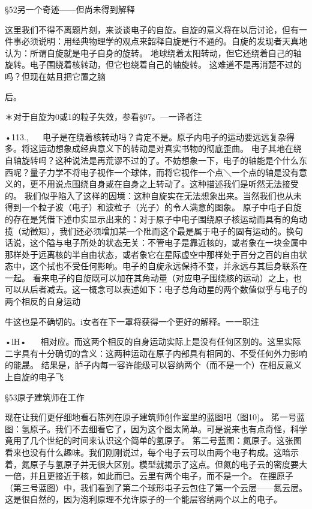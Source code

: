 §52另一个奇迹——但尚未得到解释

这里我们不得不离题片刻，来谈谈电子的自旋。自旋的意义将在以后讨论，但有一件事必须说明：用经典物理学的观点来韶释自旋是行不通的。自旋的发现者天真地认为：所谓自旋就是电子自身的旋转。
地球绕着太阳转动，但它还绕着自己的轴旋转。电子围绕着核转动，但它也绕着自己的轴旋转。
这难道不是再消楚不过的吗？但现在姑且把它置之脑

后。

＊对于自旋为0或1的粒子失效，参看§97。—一译者注

•113.,
  
电子是在绕着核转动吗？肯定不是。原子内电子的运动要远远复杂得多。将这运动想象成经典意义下的转动是对真实书物的彻底歪曲。
电子其地在绕自轴旋转吗？这种说法是再荒谬不过的了。不妨想象一下，电子的轴能是个什么东西呢？量子力学不将电子视作一个球体，而将它视作一个点＼一个点的轴是没有意义的，更不用说点围绕自身或在自身之上转动了。这种描述我们是听然无法接受的。
我们似乎陷入了这样的因境：这种自旋实在无法想象出来。当然我们也从未得到一个粒子波（电子）和波粒子（光子）的令人满意的图象。
原子中屯子自旋的存在是凭借下述巾实显示出来的：对于原子中电子围绕原子核运动而具有的角动揽（动徵矩），我们还必须增加某一个阰而这个最是属于电子的固有运动的。换句话说，这个隘与电子所处的状态无关：不管电子是靠近核的，或者象在一块金属中那样处于远离核的半自由状态，或者象它在星际虚空中那样处于百分之百的自由状态中，这个拭也不受任何影响。电子的自旋永远保持不变，并永远与其启身联系在一起。
看来电子的自旋既可以加在其角动量（对应电子围绕核的运动）之上，也可以从后者减去。这一概念可以表述如下：电子总角动星的两个数值似乎与电子的两个相反的自身运动

牛这也是不确切的。i女者在下一罩将获得一个更好的解释。一一职注

•lH•
  
相对应。而这两个相反的自身运动实际上是没有任何区别的。这里实际二字具有十分确切的含义：这两种运动在原子内部具有相同的、不受任何外力影响的能晟。
结果是，胪子内每一容许能级可以容纳两个（而不是一个）在相反意义上自旋的电子飞

§53原子建筑师在工作

现在让我们更仔细地看石陈列在原子建筑师创作室里的蓝图吧（图10)。
笫一号蓝图：氢原子。我们不去细看它了，因为这个图太简单。可是说来也有点奇怪，科学竟用了几个世纪的时间来认识这个简单的氢原子。
笫二号蓝图：氮原子。这张图看来也没有什么趣味。我们刚刚说过，每个电子云可以由两个电子构成。这暗示着，氮原子与氢原子并无很大区别。模型就揭示了这点。但氮的电子云的密度要大一倍，并且更接近于核，如此而巳。云里有两个电子，而不是一个。
在捚原子（第三号蓝图）中，我们看到了第二个球形屯子云包住了第一个云层——氮云层。这是很自然的，因为泡利原理不允许原子的一个能层容纳两个以上的电子。

